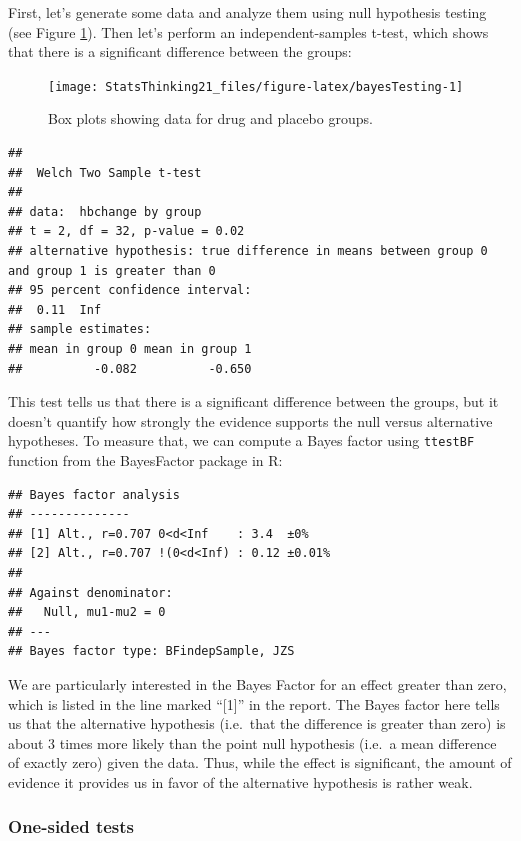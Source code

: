 \documentclass[
  12pt,
]{book}
\begin{document}
First, let's generate some data and analyze them using null hypothesis testing (see Figure \ref{fig:bayesTesting}). Then let's perform an independent-samples t-test, which shows that there is a significant difference between the groups:

\begin{figure}
\texttt{[image: StatsThinking21\_files/figure-latex/bayesTesting-1]} \caption{Box plots showing data for drug and placebo groups.}\label{fig:bayesTesting}
\end{figure}

\begin{verbatim}
## 
##  Welch Two Sample t-test
## 
## data:  hbchange by group
## t = 2, df = 32, p-value = 0.02
## alternative hypothesis: true difference in means between group 0 and group 1 is greater than 0
## 95 percent confidence interval:
##  0.11  Inf
## sample estimates:
## mean in group 0 mean in group 1 
##          -0.082          -0.650
\end{verbatim}

This test tells us that there is a significant difference between the groups, but it doesn't quantify how strongly the evidence supports the null versus alternative hypotheses. To measure that, we can compute a Bayes factor using \texttt{ttestBF} function from the BayesFactor package in R:

\begin{verbatim}
## Bayes factor analysis
## --------------
## [1] Alt., r=0.707 0<d<Inf    : 3.4  ±0%
## [2] Alt., r=0.707 !(0<d<Inf) : 0.12 ±0.01%
## 
## Against denominator:
##   Null, mu1-mu2 = 0 
## ---
## Bayes factor type: BFindepSample, JZS
\end{verbatim}

We are particularly interested in the Bayes Factor for an effect greater than zero, which is listed in the line marked ``{[}1{]}'' in the report. The Bayes factor here tells us that the alternative hypothesis (i.e.~that the difference is greater than zero) is about 3 times more likely than the point null hypothesis (i.e.~a mean difference of exactly zero) given the data. Thus, while the effect is significant, the amount of evidence it provides us in favor of the alternative hypothesis is rather weak.

\hypertarget{one-sided-tests}{%
\subsubsection{One-sided tests}\label{one-sided-tests}}
\end{document}
